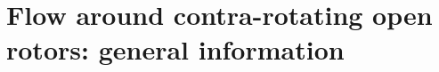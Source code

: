 \chapter{Flow around contra-rotating open rotors: general information}
\label{cha:cror_ael}

\chabstract{}

\minitoc
\newpage



\chconclu{}
